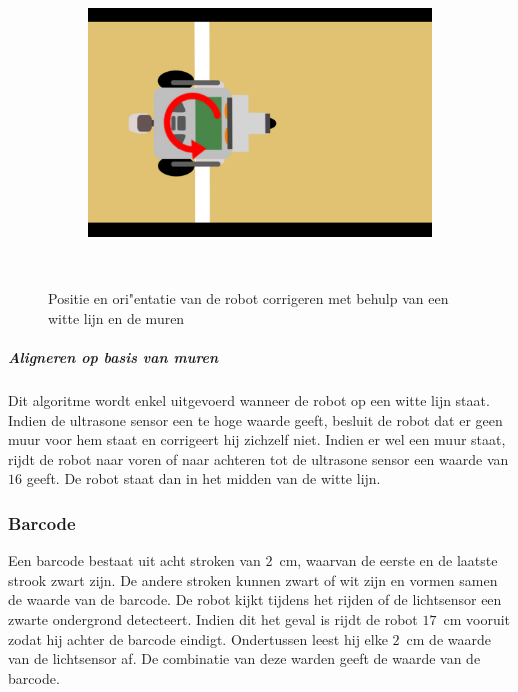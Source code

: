 \documentclass[eind]{penoverslag}
\begin{document}
\begin{figure}
\begin{subfigure}[h]{0.24\textwidth}
		\caption{ }
		\label{fig:AlgoWit6}
	\end{subfigure}
	\begin{subfigure}[h]{0.24\textwidth}
		\includegraphics[width=\textwidth]{WitteLijn7}
		\caption{ }
		\label{fig:AlgoWit7}
	\end{subfigure}\\
	\caption{Positie en ori"entatie van de robot corrigeren met behulp van een witte lijn en de muren}
	\label{fig:AlgoWit}
\end{figure}

\subparagraph{Aligneren op basis van muren}
Dit algoritme wordt enkel uitgevoerd wanneer de robot op een witte lijn staat. Indien de ultrasone sensor een te hoge waarde geeft, besluit de robot dat er geen muur voor hem staat en corrigeert hij zichzelf niet. Indien er wel een muur staat, rijdt de robot naar voren of naar achteren tot de ultrasone sensor een waarde van $16$ geeft. De robot staat dan in het midden van de witte lijn.

\subsubsection{Barcode}
\label{sssec:AlgoBar}
Een barcode bestaat uit acht stroken van $2$~cm, waarvan de eerste en de laatste strook zwart zijn. De andere stroken kunnen zwart of wit zijn en vormen samen de waarde van de barcode. De robot kijkt tijdens het rijden of de lichtsensor een zwarte ondergrond detecteert. Indien dit het geval is rijdt de robot $17$~cm vooruit zodat hij achter de barcode eindigt. Ondertussen leest hij elke $2$~cm de waarde van de lichtsensor af. De combinatie van deze warden geeft de waarde van de barcode.\\
\end{document}
